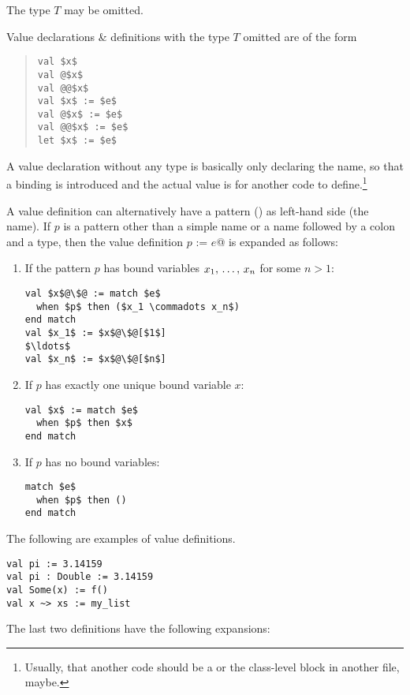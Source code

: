 The type $T$ may be omitted. 

Value declarations \& definitions with the type $T$ omitted are of the form
\begin{quote}\begin{lstlisting}
val $x$
val @$x$
val @@$x$
val $x$ := $e$
val @$x$ := $e$
val @@$x$ := $e$
let $x$ := $e$
\end{lstlisting}\end{quote}

A value declaration without any type is basically only declaring the name, so that a binding is introduced and the actual value is for another code to define.\footnote{Usually, that another code should be a  or the class-level block in another file, maybe.}

A value definition can alternatively have a pattern () as left-hand side (the name). If $p$ is a pattern other than a simple name or a name followed by a colon and a type, then the value definition \lstinline@val $p$ := $e$@ is expanded as follows: 

\begin{enumerate}
\item
If the pattern $p$ has bound variables $x_1 ,\, \ldots ,\, x_n$ for some $n > 1$:
\begin{lstlisting}[escapechar=@]
val $x$@\$@ := match $e$
  when $p$ then ($x_1 \commadots x_n$)
end match
val $x_1$ := $x$@\$@[$1$]
$\ldots$
val $x_n$ := $x$@\$@[$n$]
\end{lstlisting}

\item
If $p$ has exactly one unique bound variable $x$:
\begin{lstlisting}
val $x$ := match $e$
  when $p$ then $x$
end match
\end{lstlisting}

\item
If $p$ has no bound variables:
\begin{lstlisting}
match $e$
  when $p$ then ()
end match
\end{lstlisting}
\end{enumerate}

\example The following are examples of value definitions. 

\begin{lstlisting}
val pi := 3.14159
val pi : Double := 3.14159
val Some(x) := f()
val x ~> xs := my_list
\end{lstlisting}

The last two definitions have the following expansions:

